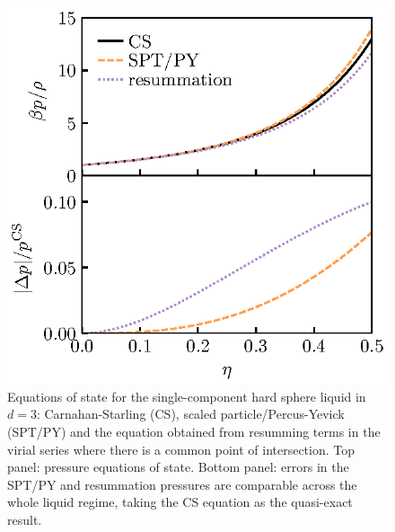 \documentclass[11pt,twoside]{report}
\begin{document}
\begin{figure}
  \includegraphics[width=0.9\linewidth,outer]{resummation-pressure}
  \caption[Accuracy of the equation of state obtained from partially resumming the virial series]{
    Equations of state for the single-component hard sphere liquid in $d=3$: Carnahan-Starling (CS), scaled particle/Percus-Yevick (SPT/PY) and the equation obtained from resumming terms in the virial series where there is a common point of intersection.
    Top panel: pressure equations of state.
    Bottom panel: errors in the SPT/PY and resummation pressures are comparable across the whole liquid regime, taking the CS equation as the quasi-exact result.}
  \label{fig:resummation-pressure}
\end{figure}
\end{document}
